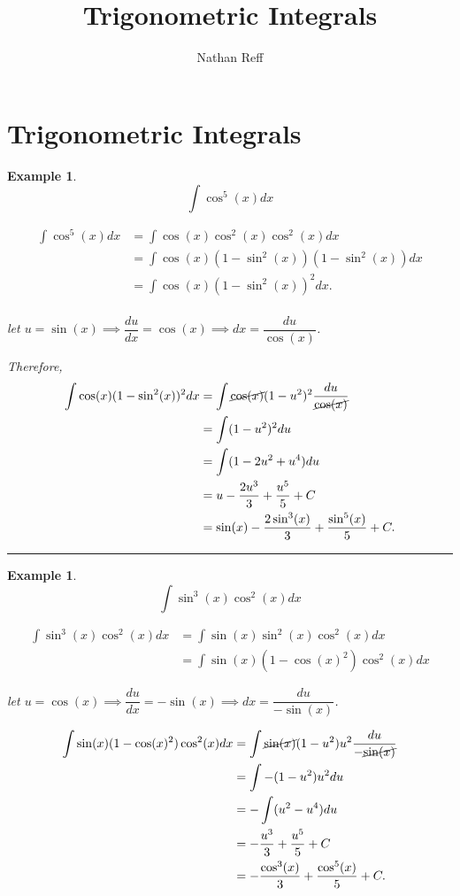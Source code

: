 \documentclass[reqno]{amsart}
\newtheorem{eg}[lem]{Example}
\numberwithin{equation}{section}
\begin{document}
\title{Trigonometric Integrals}

 
\author{Nathan Reff}
\address{Department of Mathematics\\Alfred University\\ Alfred, NY 14802, U.S.A.}

\maketitle

\section{Trigonometric Integrals}


\begin{eg}  \[ \int \cos^5(x) dx\]

\begin{align*}
\int \cos^5(x) dx &= \int \cos(x)\cos^2(x)\cos^2(x) dx \\
&= \int \cos(x)(1-\sin^2(x))(1-\sin^2(x))dx \\
&= \int \cos(x)(1-\sin^2(x))^2 dx.\\
\end{align*}

let $u=\sin(x) \implies \dfrac{du}{dx}=\cos(x) \implies dx = \dfrac{du}{\cos(x)}$.

Therefore, 
\begin{align*}
\int \cos(x)(1-\sin^2(x))^2 dx &= \int \cancel{\cos(x)} (1-u^2)^2 \frac{du}{\cancel{\cos(x)}} \\
&= \int (1-u^2)^2 du \\
&= \int (1-2u^2+u^4)du \\
&= u-\frac{2u^3}{3}+\frac{u^5}{5}+C \\
&= \sin(x)-\frac{2\sin^3(x)}{3}+\frac{\sin^5(x)}{5}+C.
\end{align*}
 
\end{eg} 

\hrule

\begin{eg} \[ \int \sin^3(x)\cos^2(x) dx\]

\begin{align*}
\int \sin^3(x)\cos^2(x) dx &= \int \sin(x)\sin^2(x)\cos^2(x) dx \\
&= \int \sin(x)(1-\cos(x)^2)\cos^2(x) dx
\end{align*}

let $u=\cos(x) \implies \dfrac{du}{dx}=-\sin(x) \implies dx = \dfrac{du}{-\sin(x)}$.

\begin{align*}
\int \sin(x)(1-\cos(x)^2)\cos^2(x) dx &= \int \cancel{\sin(x)}(1-u^2)u^2 \dfrac{du}{-\cancel{\sin(x)}} \\
&= \int -(1-u^2)u^2 du \\
&= -\int (u^2-u^4) du \\
&= -\frac{u^3}{3} + \frac{u^5}{5} +C\\
&= -\frac{\cos^3(x)}{3} + \frac{\cos^5(x)}{5} +C.
 \end{align*}
\end{eg}
\end{document}
